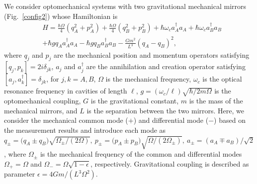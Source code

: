 \documentclass[twocolumn,superscriptaddress,aps,preprintnumbers,amsmath,amssymb,prl,nofootinbib]{revtex4}
\begin{document}
We consider optomechanical systems with two gravitational mechanical mirrors (Fig.~\ref{config2}) whose Hamiltonian is
\begin{align}
    &H=
    \frac{\hbar\Omega}{4}(q_A^2+p_A^2)+
    \frac{\hbar\Omega}{4}(q_B^2+p_B^2)
    +\hbar\omega_ca_A^\dagger a_A
 +\hbar\omega_ca_B^\dagger a_B
 \nonumber\\
    &   
 +\hbar gq_Aa_A^\dagger a_A
    -\hbar gq_Ba_B^\dagger a_B
    -\frac{Gm^2}{L^3}(q_A-q_B)^2,
\end{align}
where $q_j$ and $p_j$ are the mechanical position and momentum operators satisfying $[q_j,p_k]=2i\delta_{jk}$, $a_j$ and $a_j^\dagger$ are the annihilation and creation operator satisfying $[a_j,a_k^\dagger]=\delta_{jk}$, for $j,k=A,B$, 
$\Omega$ is the mechanical frequency, $\omega_c$ is the optical resonance 
frequency in cavities of length $\ell$,
$g=(\omega_c/\ell)\sqrt{\hbar/2m\Omega}$ is the optomechanical coupling, $G$ is the gravitational constant, $m$ is the mass of the mechanical mirrors, and $L$ is the separation between the two mirrors.
Here, we consider the mechanical common mode ($+$) and differential mode ($-$) based on the measurement results and introduce each mode as
    $q_\pm=
    \bigl(q_A\pm q_B\bigr)\sqrt{{\Omega_\pm}/({2\Omega})},~
    p_\pm=
    \bigl(p_A\pm p_B\bigr)    \sqrt{{\Omega}/({2\Omega_\pm})},~
    a_\pm=
    ({a_A\mp a_B})/{\sqrt{2}}$,
where $\Omega_\pm$ is the mechanical frequency of the common and differential modes $\Omega_+=\Omega$ and $\Omega_-=\Omega\sqrt{1-\epsilon}$, respectively. Gravitational coupling is described as 
parameter $\epsilon={4Gm}/{(L^3\Omega^2)}$.
\end{document}

